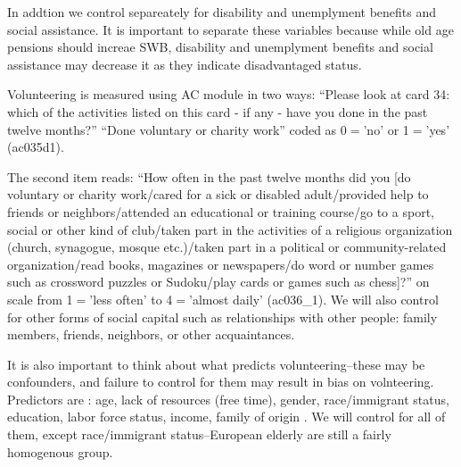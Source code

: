 \documentclass[10pt, letterpaper]{article}
\begin{document}
\begin{spacing}{1.4}
In addtion we control separeately for disability and unemplyment benefits and social
assistance. It is important to separate these variables because while old age
pensions should increae SWB, disability and unemplyment benefits and social
assistance may decrease it as they indicate disadvantaged status.

Volunteering is measured using AC module in two ways: ``Please look at card 34: which of the activities listed on this card - if any - have you done in the past twelve
months?'' ``Done voluntary or charity work'' coded as 0$=$'no' or 
1$=$'yes'  (ac035d1). 

The second item reads: ``How often in the past twelve
months did you [do voluntary or charity work/cared for a sick or disabled
adult/provided help to friends or neighbors/attended an educational or training
course/go to a sport, social or other kind of club/taken part in the activities
of a religious organization (church, synagogue, mosque etc.)/taken part in a
political or community-related organization/read books, magazines or
newspapers/do word or number games such as crossword puzzles or Sudoku/play
cards or games such as chess]?'' on scale from 1$=$'less often' to 4$=$'almost
daily' (ac036\_1). We will also control for other  forms of social capital such
as relationships with other people: family members, friends, neighbors, or other acquaintances. %
%
%
%

It is also important to think about what predicts volunteering--these may be
confounders, and failure to control for them may result in bias on
volnteering.  Predictors are : age, lack of resources (free
time), gender, race/immigrant status, education, labor force status, income,
family of origin \citet{wilson12,haski09}. %
 We will control for all of them, except race/immigrant status--European elderly
 are still a fairly homogenous group. 


\end{spacing}
\end{document}
